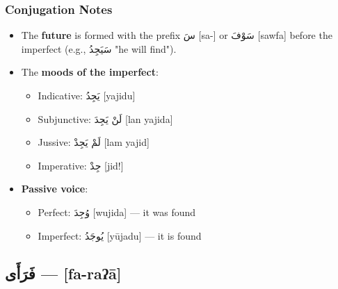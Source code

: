 \documentclass[letter,12pt]{article}
\begin{document}
\subsubsection*{Conjugation Notes}
\begin{itemize}
  \item The \textbf{future} is formed with the prefix \textarabic{سَ} [sa-] or \textarabic{سَوْفَ} [sawfa] before the imperfect (e.g., \textarabic{سَيَجِدُ} "he will find").
  \item The \textbf{moods of the imperfect}: 
    \begin{itemize}
      \item Indicative: \textarabic{يَجِدُ} [yajidu] 
      \item Subjunctive: \textarabic{لَنْ يَجِدَ} [lan yajida]
      \item Jussive: \textarabic{لَمْ يَجِدْ} [lam yajid]
      \item Imperative: \textarabic{جِدْ} [jid!]
    \end{itemize}
  \item \textbf{Passive voice}: 
    \begin{itemize}
      \item Perfect: \textarabic{وُجِدَ} [wujida] — it was found
      \item Imperfect: \textarabic{يُوجَدُ} [yūjadu] — it is found
    \end{itemize}
\end{itemize}

\subsection{\textarabic{فَرَأَى} — [fa-raʔā]}
\end{document}
